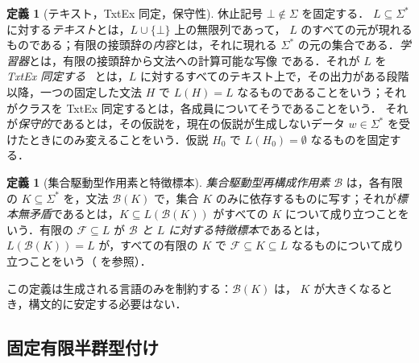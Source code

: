 \documentclass[11pt,a4paper]{ltjsarticle}
\numberwithin{equation}{section}
\theoremstyle{plain}
\theoremstyle{definition}
\newtheorem{definition}[theorem]{定義}
\theoremstyle{remark}
\newcommand{\pausesym}{\bot}
\theoremstyle{plain}
\begin{document}
\begin{definition}[テキスト，TxtEx 同定，保守性]
休止記号 $\pausesym\notin\Sigma$ を固定する．
$L\subseteq\Sigma^*$ に対する\emph{テキスト}とは，$L\cup\{\pausesym\}$ 上の無限列であって，
$L$ のすべての元が現れるものである；有限の接頭辞の\emph{内容}とは，それに現れる
$\Sigma^*$ の元の集合である．\emph{学習器}とは，有限の接頭辞から文法への計算可能な写像
である．それが $L$ を \emph{TxtEx 同定する}~\cite{Gold1967}
とは，$L$ に対するすべてのテキスト上で，その出力がある段階以降，一つの固定した文法
$H$ で $L(H)=L$ なるものであることをいう；それがクラスを TxtEx 同定するとは，各成員についてそうであることをいう．
それが\emph{保守的}であるとは，その仮説を，現在の仮説が生成しないデータ
$w\in\Sigma^*$ を受けたときにのみ変えることをいう．仮説
$H_0$ で $L(H_0)=\emptyset$ なるものを固定する．
\end{definition}

\begin{definition}[集合駆動型作用素と特徴標本]
\label{def:characteristic-sample}
\emph{集合駆動型再構成作用素} $\mathcal B$ は，各有限の
$K\subseteq\Sigma^*$ を，文法 $\mathcal B(K)$ で，集合
$K$ のみに依存するものに写す；それが\emph{標本無矛盾}であるとは，$K\subseteq L(\mathcal B(K))$ がすべての
$K$ について成り立つことをいう．有限の $\mathcal F\subseteq L$ が\emph{
$\mathcal B$ と $L$ に対する特徴標本}であるとは，$L(\mathcal B(K))=L$ が，すべての有限の $K$ で
$\mathcal F\subseteq K\subseteq L$ なるものについて成り立つことをいう（\cite{deLaHiguera1997} を参照）．
\end{definition}

この定義は生成される言語のみを制約する：$\mathcal B(K)$ は，
$K$ が大きくなるとき，構文的に安定する必要はない．

\subsection{固定有限半群型付け}
\label{subsec:semigroup-typing}
\end{document}
